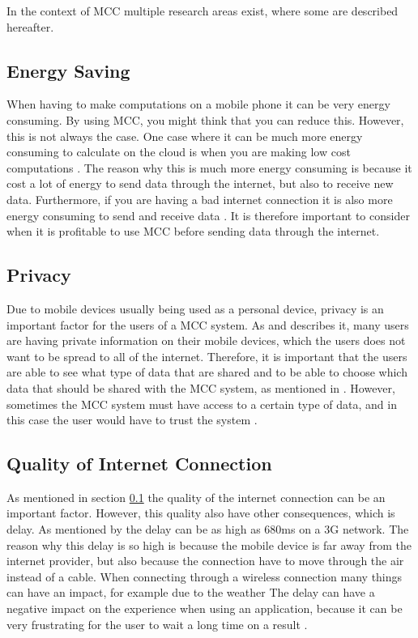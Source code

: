 In the context of MCC multiple research areas exist, where some are described hereafter.
\subsection{Energy Saving}\label{EnergySaving}
When having to make computations on a mobile phone it can be very energy consuming.
By using MCC, you might think that you can reduce this.
However, this is not always the case.
One case where it can be much more energy consuming to calculate on the cloud is when you are making low cost computations \citep{goyalmobile,liu2013gearing,fernando2013mobile}.
The reason why this is much more energy consuming is because it cost a lot of energy to send data through the internet, but also to receive new data.
Furthermore, if you are having a bad internet connection it is also more energy consuming to send and receive data \citep{goyalmobile,liu2013gearing,fernando2013mobile}.
It is therefore important to consider when it is profitable to use MCC before sending data through the internet.

\subsection{Privacy}
Due to mobile devices usually being used as a personal device, privacy is an important factor for the users of a MCC system.
As \citet{liu2013gearing} and \citet{fernando2013mobile} describes it, many users are having private information on their mobile devices, which the users does not want to be spread to all of the internet.
Therefore, it is important that the users are able to see what type of data that are shared and to be able to choose which data that should be shared with the MCC system, as mentioned in \citet{sanaei2014heterogeneity}.
However, sometimes the MCC system must have access to a certain type of data, and in this case the user would have to trust the system \citep{fernando2013mobile}.

\subsection{Quality of Internet Connection}
As mentioned in section \ref{EnergySaving} the quality of the internet connection can be an important factor.
However, this quality also have other consequences, which is delay.
As mentioned by \citet{fernando2013mobile} the delay can be as high as 680ms on a 3G network.
The reason why this delay is so high is because the mobile device is far away from the internet provider, but also because the connection have to move through the air instead of a cable.
When connecting through a wireless connection many things can have an impact, for example due to the weather \citep{dev2014review,kumar2013mobile}
The delay can have a negative impact on the experience when using an application, because it can be very frustrating for the user to wait a long time on a result \citep{hazarika2014mobile}.


